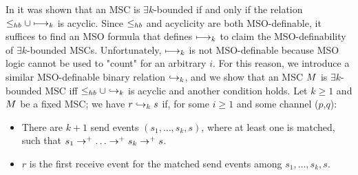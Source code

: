 In \cite{DBLP:conf/fossacs/LohreyM02} it was shown that an MSC is $\exists k$-bounded if and only if the relation $\leq_{hb} \cup \longmapsto_k$ is acyclic. Since $\leq_{hb}$ and acyclicity are both MSO-definable, it suffices to find an MSO formula that defines $\longmapsto_k$ to claim the MSO-definability of $\exists k$-bounded MSCs. Unfortunately, $\longmapsto_k$ is not MSO-definable because MSO logic cannot be used to "count" for an arbitrary $i$. For this reason, we introduce a similar MSO-definable binary relation $\hookrightarrow_{k}$, and we show that an MSC $M$ is $\exists k$-bounded MSC iff $\leq_{hb} \cup \hookrightarrow_{k}$ is acyclic and another condition holds. Let $k \ge 1$ and $M$ be a fixed MSC; we have $r \hookrightarrow_{k} s$ if, for some $i \ge 1$ and some channel ($p$,$q$):
\begin{itemize}%
	\item There are $k+1$ send events $(s_1, \dots, s_k, s)$, where at least one is matched, such that $s_1 \procrel^+ \dots \procrel^+ s_k \procrel^+ s$.
 	\item $r$ is the first receive event for the matched send events among $s_1, \dots, s_k, s$.
\end{itemize}

